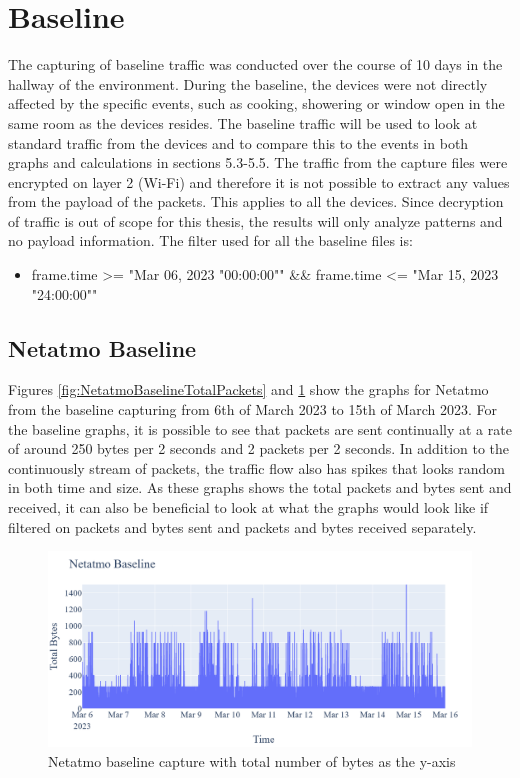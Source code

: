 \section{Baseline}
The capturing of baseline traffic was conducted over the course of 10 days in the hallway of the environment. During the baseline, the devices were not directly affected by the specific events, such as cooking, showering or window open in the same room as the devices resides. The baseline traffic will be used to look at standard traffic from the devices and to compare this to the events in both graphs and calculations in sections 5.3-5.5. The traffic from the capture files were encrypted on layer 2 (\gls{Wi-Fi}) and therefore it is not possible to extract any values from the payload of the packets. This applies to all the devices. Since decryption of traffic is out of scope for this thesis, the results will only analyze patterns and no payload information. The filter used for all the baseline files is:

\begin{itemize}
\item frame.time >= "Mar 06, 2023 "00:00:00"" \&\& frame.time <= "Mar 15, 2023 "24:00:00""
\end{itemize}

\subsection{Netatmo Baseline}
Figures \ref{fig:NetatmoBaselineTotalPackets} and \ref{fig:NetatmoBaselineTotalBytes} show the graphs for Netatmo from the baseline capturing from 6th of March 2023 to 15th of March 2023. For the baseline graphs, it is possible to see that packets are sent continually at a rate of around 250 bytes per 2 seconds and 2 packets per 2 seconds. In addition to the continuously stream of packets, the traffic flow also has spikes that looks random in both time and size. As these graphs shows the total packets and bytes sent and received, it can also be beneficial to look at what the graphs would look like if filtered on packets and bytes sent and packets and bytes received separately. 
\begin{figure} [H]
    \centering
    \includegraphics[scale=0.25]{figures/Netatmo_Baseline_TotalBytes.png}
    \caption{Netatmo baseline capture with total number of bytes as the y-axis}
    \label{fig:NetatmoBaselineTotalBytes}
\end{figure}

